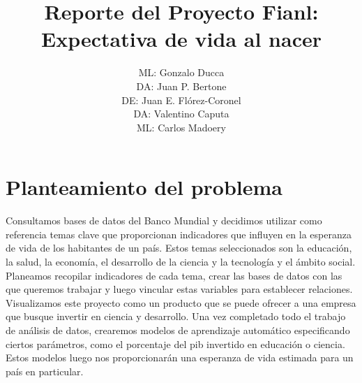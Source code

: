 \documentclass{other/docTemplate}
\author{ML: Gonzalo Ducca \formatemail{gonzaloducca@gmail.com} \\ DA: Juan P. Bertone \formatemail{bertonejpb@gmail.com} \\ DE: Juan E. Flórez-Coronel \formatemail{juan.florez@upr.edu} \\ DA: Valentino Caputa \formatemail{caputavalentino@gmail.com} \\ ML: Carlos Madoery \formatemail{ccmadoery@gmail.com}}
\title{Reporte del Proyecto Fianl: Expectativa de vida al nacer}
\begin{document}
 
\maketitle

\startTable
{}
\stopTable

\tabladecontenido
\newpage
\listadetablas
\newpage
\listadefiguras
\newpage
\printglossary[title=Lista de Acronimos ,type=\acronymtype]
\clearpage




\section{Planteamiento del problema}
Consultamos bases de datos del Banco Mundial y decidimos utilizar como referencia temas clave que proporcionan indicadores que influyen en la esperanza de vida de los habitantes de un país. Estos temas seleccionados son la educación, la salud, la economía, el desarrollo de la ciencia y la tecnología y el ámbito social.
Planeamos recopilar indicadores de cada tema, crear las bases de datos con las que queremos trabajar y luego vincular estas variables para establecer relaciones. Visualizamos este proyecto como un producto que se puede ofrecer a una empresa que busque invertir en ciencia y desarrollo.
Una vez completado todo el trabajo de análisis de datos, crearemos modelos de aprendizaje automático especificando ciertos parámetros, como el porcentaje del \gls{pib} invertido en educación o ciencia. Estos modelos luego nos proporcionarán una esperanza de vida estimada para un país en particular.
\end{document}
